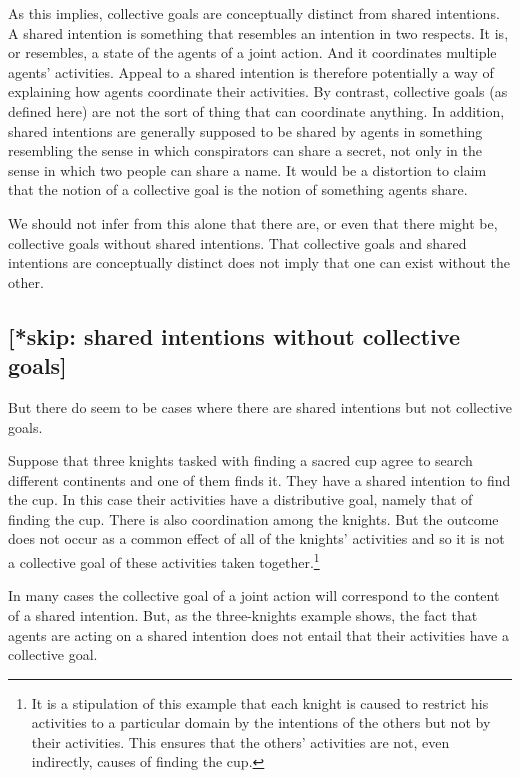 \documentclass[12pt,a4paper]{extarticle}
\begin{document}
As this implies, collective goals are conceptually distinct from shared intentions.  A shared intention is something that resembles an intention in two respects.  It is, or resembles, a state of the agents of a joint action.  And it coordinates multiple agents' activities.  Appeal to a shared intention is therefore potentially a way of explaining how agents coordinate their activities.  By contrast, collective goals (as defined here) are not the sort of thing that can coordinate anything.  In addition, shared intentions are generally supposed to be shared by agents in something resembling the sense in which conspirators can share a secret, not only in the sense in which two people can share a name.  It would be a distortion to claim that the notion of a collective goal is the notion of something agents share.

We should not infer from this alone that there are, or even that there might be, collective goals without shared intentions.  That collective goals and shared intentions are conceptually distinct does not imply that one can exist without the other.


\subsection{[*skip: shared intentions without collective goals]}
But there do seem to be cases where there are shared intentions but not collective goals.


Suppose that three knights tasked with finding a sacred cup agree to search different continents and one of them finds it.
They have a shared intention to find the cup.  
In this case their activities have a distributive goal, namely that of finding the cup.
There is also coordination among the knights.
But the outcome does not occur as a common effect of all of the knights' activities and so it is not a collective goal of these activities taken together.\footnote
{
It is a stipulation of this example that each knight is caused to restrict his activities to a particular domain by the intentions of the others but not by their activities.  This ensures that the others' activities are not, even indirectly, causes of finding the cup.
}  

In many cases the collective goal of a joint action will correspond to the content of a shared intention.  But, as the three-knights example shows, the fact that  agents are acting on a shared intention does not entail that their activities have a collective goal.
\end{document}
